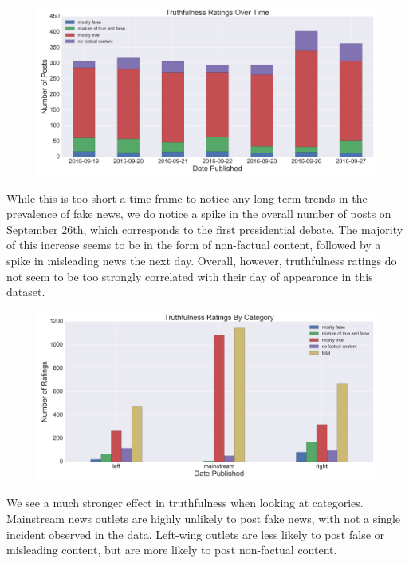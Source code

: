 \documentclass[12pt]{article}
\begin{document}
\begin{figure}[H] 
    \centering
    \includegraphics[width=\textwidth]{ratings_distribution_over_time.png}
\end{figure}

While this is too short a time frame to notice any long term trends in the prevalence of fake news, we do notice a spike in the overall number of posts on September 26th, which corresponds to the first presidential debate. The majority of this increase seems to be in the form of non-factual content, followed by a spike in misleading news the next day. Overall, however, truthfulness ratings do not seem to be too strongly correlated with their day of appearance in this dataset.

\begin{figure}[H] 
    \centering
    \includegraphics[width=\textwidth]{ratings_distribution_by_category.png}
\end{figure}

We see a much stronger effect in truthfulness when looking at categories. Mainstream news outlets are highly unlikely to post fake news, with not a single incident observed in the data. Left-wing outlets are less likely to post false or misleading content, but are more likely to post non-factual content. 
\end{document}
